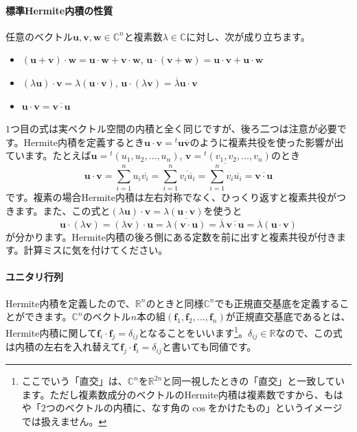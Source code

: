 \paragraph{標準Hermite内積の性質}

任意のベクトル$\bm{u}, \bm{v}, \bm{w} \in \mathbb{C}^n$と複素数$\lambda \in \mathbb{C}$に対し、次が成り立ちます。
\begin{itemize}
\item $(\bm{u} + \bm{v}) \cdot \bm{w} = \bm{u} \cdot \bm{w} + \bm{v} \cdot \bm{w}$, $\bm{u} \cdot (\bm{v} + \bm{w}) = \bm{u} \cdot \bm{v} + \bm{u} \cdot \bm{w}$
\item $(\lambda\bm{u}) \cdot \bm{v} = \lambda(\bm{u} \cdot \bm{v})$, $\bm{u} \cdot (\lambda \bm{v}) = \overline{\lambda} \bm{u} \cdot \bm{v}$
\item $\bm{u} \cdot \bm{v} = \overline{\bm{v} \cdot \bm{u}}$
\end{itemize}

$1$つ目の式は実ベクトル空間の内積と全く同じですが、後ろ二つは注意が必要です。Hermite内積を定義するとき$\bm{u} \cdot \bm{v} = {}^t \bm{u} \overline{\bm{v}}$のように複素共役を使った影響が出ています。たとえば$\bm{u} = {}^t(u_1, u_2, \ldots, u_n)$, $\bm{v} = {}^t(v_1, v_2, \ldots, v_n)$のとき
\[
\bm{u} \cdot \bm{v}
= \sum_{i = 1}^{n} u_i \overline{v_i}
= \sum_{i = 1}^{n} \overline{v_i \overline{u_i}}
= \overline{\sum_{i = 1}^{n} v_i \overline{u_i}}
= \overline{\bm{v} \cdot \bm{u}}
\]
です。複素の場合Hermite内積は左右対称でなく、ひっくり返すと複素共役がつきます。また、この式と$(\lambda\bm{u}) \cdot \bm{v} = \lambda (\bm{u} \cdot \bm{v})$を使うと
\[
\bm{u} \cdot (\lambda\bm{v}) = \overline{(\lambda \bm{v}) \cdot \bm{u}} = \overline{\lambda (\bm{v} \cdot \bm{u})} = \overline{\lambda} \, \overline{\bm{v} \cdot \bm{u}} = \overline{\lambda} (\bm{u} \cdot \bm{v})
\]
が分かります。Hermite内積の後ろ側にある定数を前に出すと複素共役が付きます。計算ミスに気を付けてください。

\paragraph{ユニタリ行列}

Hermite内積を定義したので、$\mathbb{R}^n$のときと同様$\mathbb{C}^n$でも正規直交基底を定義することができます。$\mathbb{C}^n$のベクトル$n$本の組$(\bm{f}_1, \bm{f}_2, \ldots, \bm{f}_n)$が正規直交基底であるとは、Hermite内積に関して$\bm{f}_i \cdot \bm{f}_j = \delta_{ij}$となることをいいます\footnote{ここでいう「直交」は、$\mathbb{C}^n$を$\mathbb{R}^{2n}$と同一視したときの「直交」と一致しています。ただし複素数成分のベクトルのHermite内積は複素数ですから、もはや「$2$つのベクトルの内積に、なす角の$\cos$をかけたもの」というイメージでは扱えません。}。$\delta_{ij} \in \mathbb{R}$なので、この式は内積の左右を入れ替えて$\bm{f}_j \cdot \bm{f}_i = \delta_{ij}$と書いても同値です。

